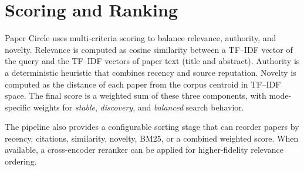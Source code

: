\section{Scoring and Ranking}
Paper Circle uses multi-criteria scoring to balance relevance, authority, and novelty. Relevance is computed as cosine similarity between a TF--IDF vector of the query and the TF--IDF vectors of paper text (title and abstract). Authority is a deterministic heuristic that combines recency and source reputation. Novelty is computed as the distance of each paper from the corpus centroid in TF--IDF space. The final score is a weighted sum of these three components, with mode-specific weights for \textit{stable}, \textit{discovery}, and \textit{balanced} search behavior.

The pipeline also provides a configurable sorting stage that can reorder papers by recency, citations, similarity, novelty, BM25, or a combined weighted score. When available, a cross-encoder reranker can be applied for higher-fidelity relevance ordering.
